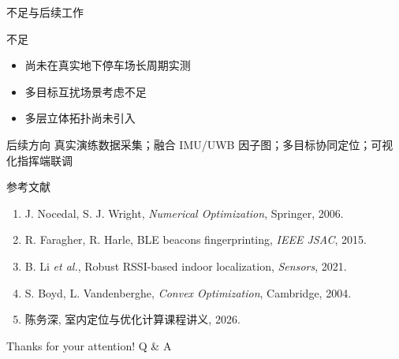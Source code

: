\documentclass[aspectratio=169]{beamer}
\begin{document}
\begin{frame}{不足与后续工作}
  \begin{block}{不足}
    \begin{itemize}
      \item 尚未在真实地下停车场长周期实测
      \item 多目标互扰场景考虑不足
      \item 多层立体拓扑尚未引入
    \end{itemize}
  \end{block}
  \begin{block}{后续方向}
    真实演练数据采集；融合 IMU/UWB 因子图；多目标协同定位；可视化指挥端联调
  \end{block}
\end{frame}

\begin{frame}{参考文献}
  \small
  \begin{enumerate}
    \setlength{\itemsep}{3pt}
    \item J. Nocedal, S. J. Wright, \emph{Numerical Optimization}, Springer, 2006.
    \item R. Faragher, R. Harle, BLE beacons fingerprinting, \emph{IEEE JSAC}, 2015.
    \item B. Li \emph{et al.}, Robust RSSI-based indoor localization, \emph{Sensors}, 2021.
    \item S. Boyd, L. Vandenberghe, \emph{Convex Optimization}, Cambridge, 2004.
    \item 陈务深, 室内定位与优化计算课程讲义, 2026.
  \end{enumerate}
\end{frame}

\begin{frame}
  \begin{center}
    {\Huge\calligra Thanks for your attention!}
    \vspace{1cm}
    {\Huge Q \& A}
  \end{center}
\end{frame}
\end{document}
